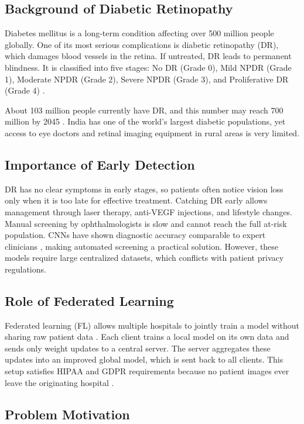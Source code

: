\documentclass[12pt, a4paper]{article}
\begin{document}
\subsection{Background of Diabetic Retinopathy}

Diabetes mellitus is a long-term condition affecting over 500 million people globally. One of its most serious complications is diabetic retinopathy (DR), which damages blood vessels in the retina. If untreated, DR leads to permanent blindness. It is classified into five stages: No DR (Grade 0), Mild NPDR (Grade 1), Moderate NPDR (Grade 2), Severe NPDR (Grade 3), and Proliferative DR (Grade 4) \cite{p10}.

About 103 million people currently have DR, and this number may reach 700 million by 2045 \cite{p3}. India has one of the world's largest diabetic populations, yet access to eye doctors and retinal imaging equipment in rural areas is very limited.

\subsection{Importance of Early Detection}

DR has no clear symptoms in early stages, so patients often notice vision loss only when it is too late for effective treatment. Catching DR early allows management through laser therapy, anti-VEGF injections, and lifestyle changes. Manual screening by ophthalmologists is slow and cannot reach the full at-risk population. CNNs have shown diagnostic accuracy comparable to expert clinicians \cite{p1}, making automated screening a practical solution. However, these models require large centralized datasets, which conflicts with patient privacy regulations.

\subsection{Role of Federated Learning}

Federated learning (FL) allows multiple hospitals to jointly train a model without sharing raw patient data \cite{p5}. Each client trains a local model on its own data and sends only weight updates to a central server. The server aggregates these updates into an improved global model, which is sent back to all clients. This setup satisfies HIPAA and GDPR requirements because no patient images ever leave the originating hospital \cite{p8}.

\subsection{Problem Motivation}
\end{document}
